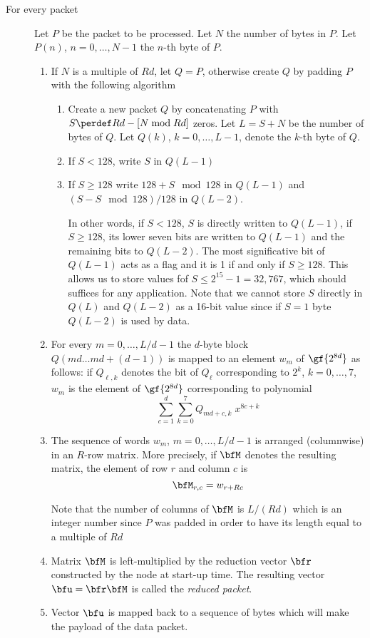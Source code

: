 \documentclass{rfc}
\begin{document}
\begin{description}
\item[For every packet] Let $P$ be the packet to be processed.  Let
  $N$ the number of bytes in $P$.  Let $P(n)$, $n=0,\ldots,N-1$ the
  $n$-th byte of $P$.
  \begin{enumerate}
    \item If $N$ is a multiple of $Rd$, let $Q=P$, otherwise create
    $Q$ by padding $P$ with the following algorithm
    \begin{enumerate}
      \item
        Create a new packet $Q$ by concatenating $P$ with $S \perdef
        Rd - [N \bmod Rd]$ zeros.  Let $L=S+N$ be the number of bytes of
        $Q$. Let $Q(k)$, $k=0, \ldots, L-1$, denote the $k$-th byte
        of $Q$.
      \item If $S < 128$, write $S$ in $Q(L-1)$
      \item If $S \geq 128$ write $128+S \mod 128$ in $Q(L-1)$ and $(S-S
      \mod 128) / 128$ in $Q(L-2)$.

      \begin{commento}
	In other words, if $S < 128$, $S$ is directly written to
	$Q(L-1)$, if $S \geq 128$, its lower seven bits are written to
	$Q(L-1)$ and the remaining bits to $Q(L-2)$.  The most
	significative bit of $Q(L-1)$ acts as a flag and it is 1 if and
	only if $S \geq 128$.  This allows us to store values fof $S
	\leq 2^{15}-1=32,767$, which should suffices for any application.  Note
	that we cannot store $S$ directly in $Q(L)$ and $Q(L-2)$ as a
	16-bit value since if $S=1$ byte $Q(L-2)$ is used by data.
      \end{commento}
    \end{enumerate}
  \item
    For every $m=0, \ldots, L/d-1$ the $d$-byte block $Q(md
    \ldots md+(d-1))$ is mapped to an element $w_m$ of $\gf{2^{8d}}$
    as follows: if $Q_{\ell,k}$ denotes the bit of $Q_\ell$
    corresponding to $2^k$, $k=0, \ldots, 7$, $w_m$ is the element of
    $\gf{2^{8d}}$ corresponding to polynomial
$$
\sum_{c=1}^d \sum_{k=0}^{7} Q_{m d+c,k}\; x^{8c+k}
$$
   \item
     The sequence of words $w_m$, $m=0, \ldots, L/d-1$ is arranged
     (columnwise) in an $R$-row matrix.  More precisely, if $\bfM$
     denotes the resulting matrix, the element of row $r$ and column
     $c$ is
$$
\bfM_{r,c} = w_{r + R c}
$$
\begin{commento}
    Note that the number of columns of $\bfM$ is $L/(Rd)$ which is
    an integer number since $P$ was padded in order to have its length
    equal to a multiple of $Rd$
\end{commento}
   \item
     Matrix $\bfM$ is left-multiplied by the reduction vector $\bfr$
     constructed by the node at start-up time.  The resulting vector
     $\bfu = \bfr \bfM$ is called the \emph{reduced packet}.
   \item Vector $\bfu$ is mapped back to a sequence of bytes which
   will make the payload of the data packet.
  \end{enumerate}
\end{description}
\end{document}
